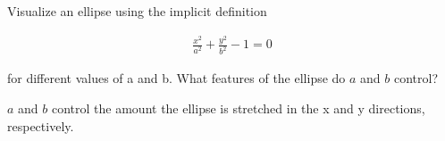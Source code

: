 Visualize an ellipse using the implicit definition

\begin{align*}
    \frac{x^2}{a^2} + \frac{y^2}{b^2} - 1 = 0
\end{align*}

for different values of a and b. What features of the ellipse do $a$ and $b$ control?

\begin{solution}
    $a$ and $b$ control the amount the ellipse is stretched in the x and y directions, respectively.
\end{solution}